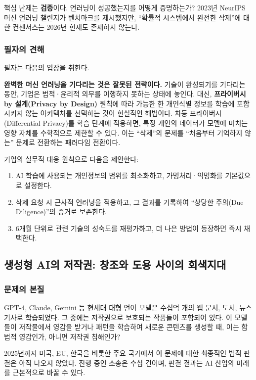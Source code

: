 핵심 난제는 \textbf{검증}이다. 언러닝이 성공했는지를 어떻게 증명하는가? 2023년 NeurIPS 머신 언러닝 챌린지가 벤치마크를 제시했지만, ``확률적 시스템에서 완전한 삭제''에 대한 컨센서스는 2026년 현재도 존재하지 않는다.

\subsubsection*{필자의 견해}

필자는 다음의 입장을 취한다.

\textbf{완벽한 머신 언러닝을 기다리는 것은 잘못된 전략이다.} 기술이 완성되기를 기다리는 동안, 기업은 법적·윤리적 의무를 이행하지 못하는 상태에 놓인다. 대신, \textbf{프라이버시 by 설계(Privacy by Design)} 원칙에 따라 가능한 한 개인식별 정보를 학습에 포함시키지 않는 아키텍처를 선택하는 것이 현실적인 해법이다. 차등 프라이버시(Differential Privacy)를 학습 단계에 적용하면, 특정 개인의 데이터가 모델에 미치는 영향 자체를 수학적으로 제한할 수 있다. 이는 ``삭제''의 문제를 ``처음부터 기억하지 않는'' 문제로 전환하는 패러다임 전환이다.

기업의 실무적 대응 원칙으로 다음을 제안한다:
\begin{enumerate}
    \item AI 학습에 사용되는 개인정보의 범위를 최소화하고, 가명처리·익명화를 기본값으로 설정한다.
    \item 삭제 요청 시 근사적 언러닝을 적용하고, 그 결과를 기록하여 ``상당한 주의(Due Diligence)''의 증거로 보존한다.
    \item 6개월 단위로 관련 기술의 성숙도를 재평가하고, 더 나은 방법이 등장하면 즉시 채택한다.
\end{enumerate}

\subsection{생성형 AI의 저작권: 창조와 도용 사이의 회색지대}
\label{sec:3.4.2}

\subsubsection*{문제의 본질}

GPT-4, Claude, Gemini 등 현세대 대형 언어 모델은 수십억 개의 웹 문서, 도서, 뉴스 기사로 학습되었다. 그 중에는 저작권으로 보호되는 작품들이 포함되어 있다. 이 모델들이 저작물에서 영감을 받거나 패턴을 학습하여 새로운 콘텐츠를 생성할 때, 이는 합법적 영감인가, 아니면 저작권 침해인가?

2025년까지 미국, EU, 한국을 비롯한 주요 국가에서 이 문제에 대한 최종적인 법적 판결은 아직 나오지 않았다. 진행 중인 소송은 수십 건이며, 판결 결과는 AI 산업의 미래를 근본적으로 바꿀 수 있다.

